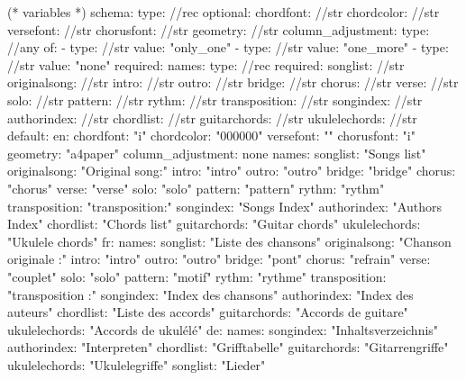 %
%
%

(* variables *)
schema:
  type: //rec
  optional:
    chordfont: //str
    chordcolor: //str
    versefont: //str
    chorusfont: //str
    geometry: //str
    column_adjustment:
      type: //any
      of:
        - type: //str
          value: "only_one"
        - type: //str
          value: "one_more"
        - type: //str
          value: "none"
  required:
    names:
      type: //rec
      required:
        songlist: //str
        originalsong: //str
        intro: //str
        outro: //str
        bridge: //str
        chorus: //str
        verse: //str
        solo: //str
        pattern: //str
        rythm: //str
        transposition: //str
        songindex: //str
        authorindex: //str
        chordlist: //str
        guitarchords: //str
        ukulelechords: //str
default:
  en:
    chordfont: "i"
    chordcolor: "000000"
    versefont: ""
    chorusfont: "i"
    geometry: "a4paper"
    column_adjustment: none
    names:
      songlist: "Songs list"
      originalsong: "Original song:"
      intro: "intro"
      outro: "outro"
      bridge: "bridge"
      chorus: "chorus"
      verse: "verse"
      solo: "solo"
      pattern: "pattern"
      rythm: "rythm"
      transposition: "transposition:"
      songindex: "Songs Index"
      authorindex: "Authors Index"
      chordlist: "Chords list"
      guitarchords: "Guitar chords"
      ukulelechords: "Ukulele chords"
  fr:
    names:
      songlist: "Liste des chansons"
      originalsong: "Chanson originale :"
      intro: "intro"
      outro: "outro"
      bridge: "pont"
      chorus: "refrain"
      verse: "couplet"
      solo: "solo"
      pattern: "motif"
      rythm: "rythme"
      transposition: "transposition :"
      songindex: "Index des chansons"
      authorindex: "Index des auteurs"
      chordlist: "Liste des accords"
      guitarchords: "Accords de guitare"
      ukulelechords: "Accords de ukulélé"
  de:
    names:
      songindex: "Inhaltsverzeichnis"
      authorindex: "Interpreten"
      chordlist: "Grifftabelle"
      guitarchords: "Gitarrengriffe"
      ukulelechords: "Ukulelegriffe"
      songlist: "Lieder"

